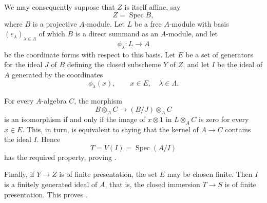 We may consequently suppose that \(Z\) is itself affine, say
\[
  Z=\operatorname{Spec}B,
\]
where \(B\) is a projective \(A\)-module. Let \(L\) be a free
\(A\)-module with basis \((e_\lambda)_{\lambda\in\Lambda}\) of
which \(B\) is a direct summand as an \(A\)-module, and let
\[
  \phi_\lambda:L\longrightarrow A
\]
be the coordinate forms with respect to this basis. Let \(E\)
be a set of generators for the ideal \(J\) of \(B\) defining
the closed subscheme \(Y\) of \(Z\), and let \(I\) be the ideal
of \(A\) generated by the coordinates
\[
  \phi_\lambda(x),
  \qquad x\in E,\quad \lambda\in\Lambda.
\]

For every \(A\)-algebra \(C\), the morphism
\[
  B\otimes_A C\longrightarrow(B/J)\otimes_A C
\]
is an isomorphism if and only if the image of \(x\otimes1\) in
\(L\otimes_A C\) is zero for every \(x\in E\). This, in turn,
is equivalent to saying that the kernel of \(A\to C\) contains
the ideal \(I\). Hence
\[
  T=V(I)=\operatorname{Spec}(A/I)
\]
has the required property, proving \textup{}.

Finally, if \(Y\to Z\) is of finite presentation, the set \(E\)
may be chosen finite. Then \(I\) is a finitely generated ideal
of \(A\), that is, the closed immersion \(T\to S\) is of finite
presentation. This proves \textup{}.

